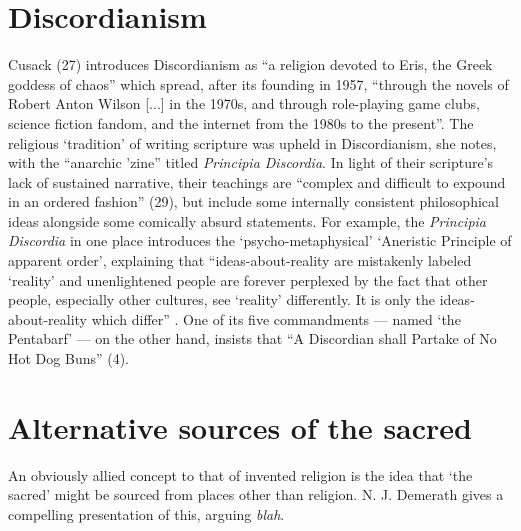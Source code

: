 \documentclass[Draft.tex]{subfiles}
\begin{document}
\section*{Discordianism}
Cusack (27) introduces Discordianism as
``a religion devoted to Eris, the Greek goddess of chaos''
which spread, after its founding in 1957, ``through
the novels of Robert Anton Wilson [...] in the 1970s,
and through role-playing game clubs, science fiction fandom,
and the internet from the 1980s to the present''.
The religious `tradition' of writing scripture was upheld in Discordianism,
she notes, with the ``anarchic 'zine'' titled \textit{Principia Discordia}.
In light of their scripture's lack of sustained narrative, their teachings
are ``complex and difficult to expound in an ordered fashion'' (29),
but include some internally consistent philosophical ideas
alongside some comically absurd statements.
For example, the \textit{Principia Discordia} in one place introduces the
`psycho-metaphysical' `Aneristic Principle of apparent order',
explaining that ``ideas-about-reality are mistakenly labeled `reality'
and unenlightened people are forever perplexed by the fact that
other people, especially other cultures, see `reality' differently.
It is only the ideas-about-reality which differ'' \parencite[49]{Principia}.
One of its five commandments --- named `the Pentabarf' ---
on the other hand, insists that
``A Discordian shall Partake of No Hot Dog Buns'' (4).


\section*{Alternative sources of the sacred}
An obviously allied concept to that of invented religion
is the idea that `the sacred' might be sourced
from places other than religion.
N. J. Demerath \parencite*{Demerath00} gives a compelling presentation
of this, arguing \textit{blah}.
\end{document}
